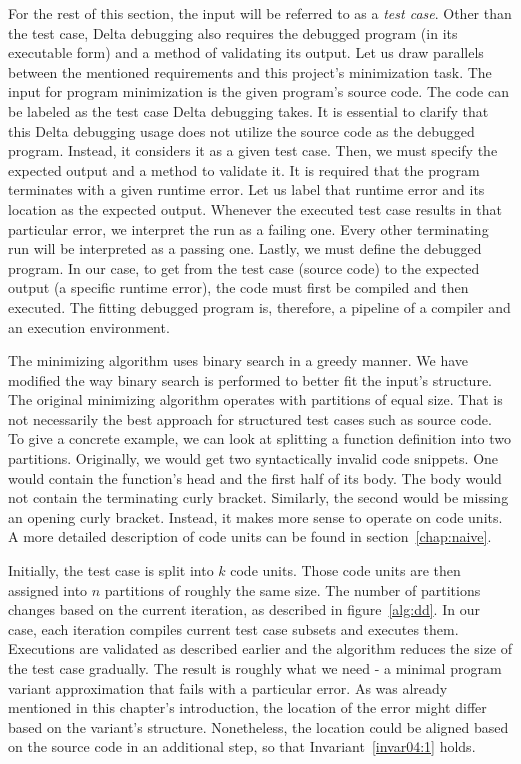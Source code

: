 For the rest of this section, the input will be referred to as 
a \emph{test case}.
Other than the test case, Delta debugging also requires the debugged program 
(in its executable form) and a method of validating its output.
Let us draw parallels between the mentioned requirements and this project's 
minimization task.
The input for program minimization is the given program's source code.
The code can be labeled as the test case Delta debugging takes.
It is essential to clarify that this Delta debugging usage does not utilize 
the source code as the debugged program.
Instead, it considers it as a given test case.
Then, we must specify the expected output and a method to validate it.
It is required that the program terminates with a given runtime error.
Let us label that runtime error and its location as the expected output.
Whenever the executed test case results in that particular error, we 
interpret the run as a failing one.
Every other terminating run will be interpreted as a passing one.
Lastly, we must define the debugged program.
In our case, to get from the test case (source code) to the expected 
output (a specific runtime error), the code must first be compiled 
and then executed.
The fitting debugged program is, therefore, a pipeline of a compiler and 
an execution environment.

The minimizing algorithm uses binary search in a greedy manner.
We have modified the way binary search is performed to better fit the input's
structure.
The original minimizing algorithm operates with partitions of equal size.
That is not necessarily the best approach for structured test cases such
as source code.
To give a concrete example, we can look at splitting a function definition
into two partitions.
Originally, we would get two syntactically invalid code snippets.
One would contain the function's head and the first half of its body.
The body would not contain the terminating curly bracket.
Similarly, the second would be missing an opening curly bracket.
Instead, it makes more sense to operate on code units.
A more detailed description of code units can be found in 
section~\ref{chap:naive}.

Initially, the test case is split into $k$ code units.
Those code units are then assigned into $n$ partitions of roughly the same 
size.
The number of partitions changes based on the current iteration, as described
in figure~\ref{alg:dd}.
In our case, each iteration compiles current test case subsets and executes 
them.
Executions are validated as described earlier and the algorithm reduces
the size of the test case gradually.
The result is roughly what we need - a minimal program variant approximation 
that fails with a particular error.
As was already mentioned in this chapter's introduction, the location of 
the error might differ based on the variant's structure.
Nonetheless, the location could be aligned based on the source code in 
an additional step, so that Invariant~\ref{invar04:1} holds.

